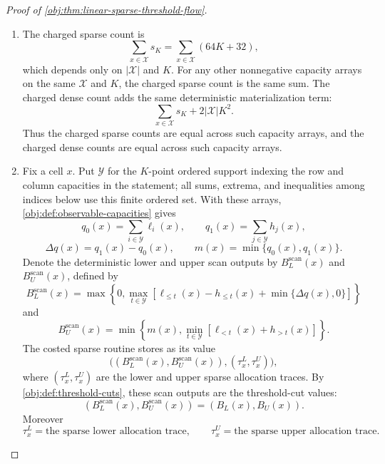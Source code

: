 \documentclass[11pt]{article}
\begin{document}
\begin{proof}[Proof of \cref{obj:thm:linear-sparse-threshold-flow}]
\begin{enumerate}
\item The charged sparse count is
\[
\sum_{x\in\mathcal X}s_K=\sum_{x\in\mathcal X}(64K+32),
\]
which depends only on \(|\mathcal X|\) and \(K\).  For any other nonnegative capacity arrays on the same \(\mathcal X\) and \(K\), the charged sparse count is the same sum.  The charged dense count adds the same deterministic materialization term:
\[
\sum_{x\in\mathcal X}s_K+2|\mathcal X|K^2 .
\]
Thus the charged sparse counts are equal across such capacity arrays, and the charged dense counts are equal across such capacity arrays.

\item Fix a cell \(x\).  Put \(\mathcal Y\) for the \(K\)-point ordered support indexing the row and column capacities in the statement; all sums, extrema, and inequalities among indices below use this finite ordered set.  With these arrays, \cref{obj:def:observable-capacities} gives
\[
q_0(x)=\sum_{i\in\mathcal Y}\ell_i(x),
\qquad
q_1(x)=\sum_{j\in\mathcal Y}h_j(x),
\]
\[
\Delta q(x)=q_1(x)-q_0(x),
\qquad
m(x)=\min\{q_0(x),q_1(x)\}.
\]
Denote the deterministic lower and upper scan outputs by \(B_L^{\mathrm{scan}}(x)\) and \(B_U^{\mathrm{scan}}(x)\), defined by
\[
B_L^{\mathrm{scan}}(x)
=
\max\left\{0,\max_{t\in\mathcal Y}
\left[\ell_{\le t}(x)-h_{\le t}(x)+\min\{\Delta q(x),0\}\right]\right\}
\]
and
\[
B_U^{\mathrm{scan}}(x)
=
\min\left\{m(x),\min_{t\in\mathcal Y}
\left[\ell_{<t}(x)+h_{>t}(x)\right]\right\}.
\]
The costed sparse routine stores as its value
\[
\bigl((B_L^{\mathrm{scan}}(x),B_U^{\mathrm{scan}}(x)),
       (\tau_x^L,\tau_x^U)\bigr),
\]
where \((\tau_x^L,\tau_x^U)\) are the lower and upper sparse allocation traces.  By \cref{obj:def:threshold-cuts}, these scan outputs are the threshold-cut values:
\[
(B_L^{\mathrm{scan}}(x),B_U^{\mathrm{scan}}(x))=(B_L(x),B_U(x)).
\]
Moreover
\[
\tau_x^L=\text{the sparse lower allocation trace},
\qquad
\tau_x^U=\text{the sparse upper allocation trace}.
\]


\end{enumerate}
\end{proof}
\end{document}
